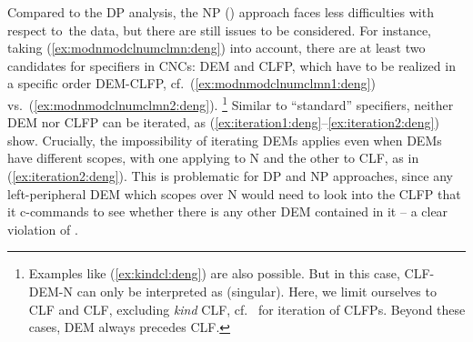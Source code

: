 \documentclass[output=paper,colorlinks,citecolor=brown]{langscibook}
\begin{document}
Compared to the DP analysis, the NP () approach faces less difficulties with respect to\ the data, but there are still issues to be considered. 
%
For instance, taking (\ref{ex:modnmodclnumclmn:deng}) into account, there are at least two candidates for specifiers in CNCs: DEM and CLFP, which have to be realized in a specific order DEM-CLFP, cf.\ (\ref{ex:modnmodclnumclmn1:deng}) vs.\ (\ref{ex:modnmodclnumclmn2:deng}).%
%
\footnote{Examples like (\ref{ex:kindcl:deng}) are also possible. But in this case, CLF-DEM-N can only be interpreted as  (singular). Here, 
we limit ourselves to CLF and CLF, excluding \emph{kind} CLF, cf.\ \citet{Liao&Wang11a} for  iteration of CLFPs.	
Beyond these cases, DEM always precedes CLF. 
	\z 
} %
%
Similar to ``standard'' specifiers, neither DEM nor CLFP can be iterated, as  (\ref{ex:iteration1:deng}--\ref{ex:iteration2:deng}) show. %
%
%
Crucially, the impossibility of iterating DEMs applies even when DEMs have different scopes, with one applying to N and the other to CLF, as in (\ref{ex:iteration2:deng}). 
%
This is problematic for DP and NP approaches, since any left-peripheral DEM which scopes over N would need to look into the CLFP that it c-commands to see whether there is any other DEM contained in it -- a clear violation of . 


\ea\label{ex:modnmodclnumclmn:deng}
\label{ex:modnmodclnumclmn1:deng}

\label{ex:modnmodclnumclmn2:deng}
\z
\end{document}
